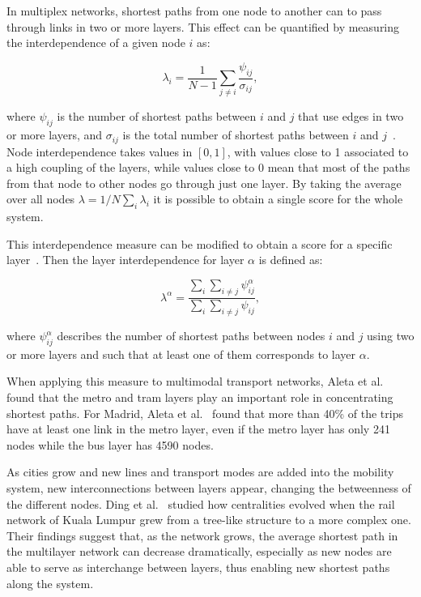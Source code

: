 In multiplex networks, shortest paths from one node to another can to pass through links in two or more layers. This effect can be quantified by measuring the interdependence of a given node $i$ as:

\begin{equation}
    \lambda_i=\frac{1}{N-1}\sum_{j\neq i}\frac{\psi_{ij}}{\sigma_{ij}},
    \label{eq:coupling}
\end{equation}

where $\psi_{ij}$ is the number of shortest paths between $i$ and $j$ that use edges in two or more layers, and $\sigma_{ij}$ is the total number of shortest paths between $i$ and $j$~\cite{morris2012transport,battiston2014structural,strano2015features}. Node interdependence takes values in $[0, 1]$, with values close to 1 associated to a high coupling of the layers, while values close to $0$ mean that most of the paths from that node to other nodes go through just one layer. By taking the average over all nodes $\lambda = 1/N \sum_i\lambda_i$ it is possible to obtain a single score for the whole system. 

This interdependence measure can be modified to obtain a score for a specific layer~\cite{Aleta2017Multilayer}. Then the layer interdependence for layer $\alpha$ is defined as:

\begin{equation}\label{eq:layer_interdependency}
    \lambda^{\alpha}=\frac{\sum_i\sum_{i\neq j}\psi_{ij}^{\alpha}}{\sum_i\sum_{i\neq j}\psi_{ij}},
\end{equation}

where $\psi_{ij}^\alpha$ describes the number of shortest paths between nodes $i$ and $j$ using two or more layers and such that at least one of them corresponds to layer $\alpha$.

When applying this measure to multimodal transport networks, Aleta et al.~\cite{Aleta2017Multilayer} found that the metro and tram layers play an important role in concentrating shortest paths. For Madrid, Aleta et al.~\cite{Aleta2017Multilayer} found that more than 40\% of the trips have at least one link in the metro layer, even if the metro layer has only 241 nodes while the bus layer has 4590 nodes. 

As cities grow and new lines and transport modes are added into the mobility system, new interconnections between layers appear, changing the betweenness of the different nodes. Ding et al.~\cite{ding2018traffic} studied how centralities evolved when the rail network of Kuala Lumpur grew from a tree-like structure to a more complex one. Their findings suggest that, as the network grows, the average shortest path in the multilayer network can decrease dramatically, especially as new nodes are able to serve as interchange between layers, thus enabling new shortest paths along the system.

